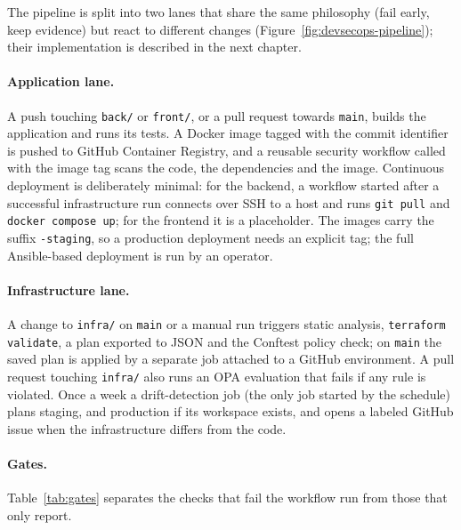 The pipeline is split into two lanes that share the same philosophy (fail early, keep evidence) but react to different changes (Figure~\ref{fig:devsecops-pipeline}); their implementation is described in the next chapter.



\paragraph{Application lane.} A push touching \texttt{back/} or \texttt{front/}, or a pull request towards \texttt{main}, builds the application and runs its tests. A Docker image tagged with the commit identifier is pushed to GitHub Container Registry, and a reusable security workflow called with the image tag scans the code, the dependencies and the image. Continuous deployment is deliberately minimal: for the backend, a workflow started after a successful infrastructure run connects over SSH to a host and runs \texttt{git pull} and \texttt{docker compose up}; for the frontend it is a placeholder. The images carry the suffix \texttt{-staging}, so a production deployment needs an explicit tag; the full Ansible-based deployment is run by an operator.

\paragraph{Infrastructure lane.} A change to \texttt{infra/} on \texttt{main} or a manual run triggers static analysis, \texttt{terraform validate}, a plan exported to JSON and the Conftest policy check; on \texttt{main} the saved plan is applied by a separate job attached to a GitHub environment. A pull request touching \texttt{infra/} also runs an OPA evaluation that fails if any rule is violated. Once a week a drift-detection job (the only job started by the schedule) plans staging, and production if its workspace exists, and opens a labeled GitHub issue when the infrastructure differs from the code.

\paragraph{Gates.} Table~\ref{tab:gates} separates the checks that fail the workflow run from those that only report.

